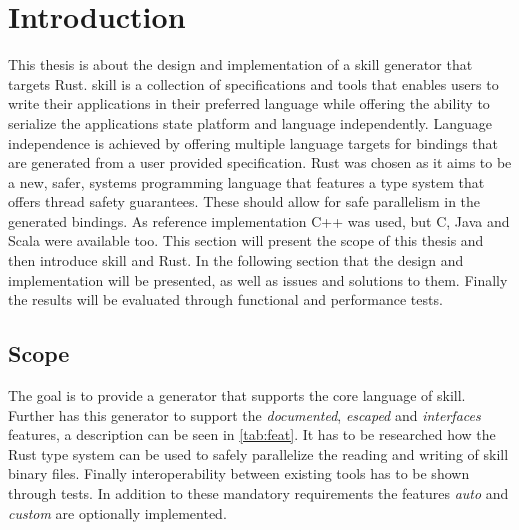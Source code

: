 \documentclass[thesis]{subfiles}
\begin{document}
\chapter{Introduction}\label{sec:intro}
This thesis is about the design and implementation of a \gls{skill} generator that targets Rust.
\gls{skill} is a collection of specifications and tools that enables users to write their applications in their preferred language while offering the ability to serialize the applications state platform and language independently\autocite{skill-tr}.
Language independence is achieved by offering multiple language targets for bindings that are generated from a user provided specification.
Rust was chosen as it aims to be a new, safer, systems programming language that features a type system that offers thread safety guarantees\autocite{rust-org}.
These should allow for safe parallelism in the generated bindings.
As reference implementation C++ was used, but C, Java and Scala were available too.
This section will present the scope of this thesis and then introduce \gls{skill} and Rust.
In the following section that the design and implementation will be presented, as well as issues and solutions to them.
Finally the results will be evaluated through functional and performance tests.

\section{Scope}
  The goal is to provide a generator that supports the core language of \gls{skill}\autocite{skill-tr}.
  Further has this generator to support the \emph{documented}, \emph{escaped} and \emph{interfaces} features, a description can be seen in \autoref{tab:feat}.
  It has to be researched how the Rust type system can be used to safely parallelize the reading and writing of \gls{skill} binary files.
  Finally interoperability between existing tools has to be shown through tests.
  In addition to these mandatory requirements the features \emph{auto} and \emph{custom} are optionally implemented.
\end{document}
